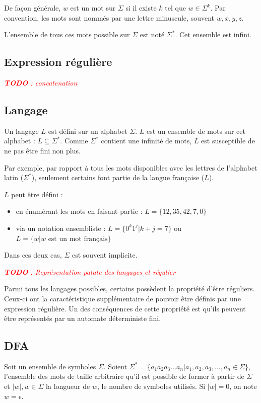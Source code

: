 \documentclass[french,letterpaper, 12pt]{article}
\newcounter{note}[section]
\newcommand{\todo}[1]{\textcolor{red}{\emph{\textbf{TODO} : #1}}}
\begin{document}
	De façon générale, $w$ est un mot sur $\Sigma$ si il existe $k$ tel que $w \in \Sigma^k$. Par convention, les mots sont nommés par une lettre minuscule, souvent $w,x,y,z$. 
	
	L'ensemble de tous ces mots possible sur $\Sigma$ est noté $\Sigma^*$. Cet ensemble est infini.
	

	\subsection{Expression régulière}
			\todo{concatenation}
	
	\subsection{Langage}
	
	Un langage $L$ est défini sur un alphabet $\Sigma$. $L$ est un ensemble de mots sur cet alphabet : $L \subseteq \Sigma^*$. Comme $\Sigma^*$ contient une infinité de mots, $L$ est susceptible de ne pas être fini non plus.
	
	Par exemple, par rapport à tous les mots disponibles avec les lettres de l'alphabet latin ($\Sigma^*$), seulement certains font partie de la langue française ($L$).
	
	$L$ peut être défini  :
	\begin{itemize}
		\item en énumérant les mots en faisant partie : $L=\{12,35,42,7,0\}$
		\item via un notation ensembliste : $L=\{0^k1^j|k+j=7\}$ ou $L=\{w|w \text{ est un mot français}\}$
	\end{itemize}
	Dans ces deux cas, $\Sigma$ est souvent implicite.
	
	\todo{Représentation patate des langages et régulier}
	
	Parmi tous les langages possibles, certains possèdent la propriété d'être réguliers. Ceux-ci ont la caractéristique supplémentaire de pouvoir être définis par une expression régulière. Un des conséquences de cette propriété est qu'ils peuvent être représentés par un automate déterministe fini.
	
	
	
	
	
	\subsection{DFA}\label{sub:dfa}
	Soit un ensemble de symboles $\Sigma$. Soient $\Sigma^* = \{ a_1a_2a_3...a_n | a_1,a_2,a_3,...,a_n \in \Sigma \}$, l'ensemble des mots de taille arbitraire qu'il est possible de former à partir de $\Sigma$ et $|w|, w \in \Sigma$ la longueur de $w$, le nombre de symboles utilisés. Si $|w|=0$, on note $w=\epsilon$.
	
\end{document}
